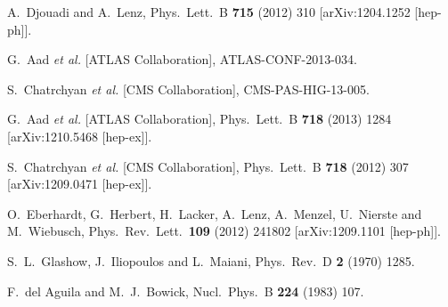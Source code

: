 \documentclass[12pt,a4paper]{article}
\begin{document}
\begin{thebibliography}{99}

  A.~Djouadi and A.~Lenz,
  Phys.\ Lett.\ B {\bf 715} (2012) 310
  [arXiv:1204.1252 [hep-ph]].

 G.~Aad {\it et al.}  [ATLAS Collaboration],
  ATLAS-CONF-2013-034.

 S.~Chatrchyan {\it et al.}  [CMS Collaboration],
  CMS-PAS-HIG-13-005.

  G.~Aad {\it et al.}  [ATLAS Collaboration],
  Phys.\ Lett.\ B {\bf 718} (2013) 1284
  [arXiv:1210.5468 [hep-ex]].

  S.~Chatrchyan {\it et al.}  [CMS Collaboration],
  Phys.\ Lett.\ B {\bf 718} (2012) 307
  [arXiv:1209.0471 [hep-ex]].

  O.~Eberhardt, G.~Herbert, H.~Lacker, A.~Lenz, A.~Menzel, U.~Nierste and M.~Wiebusch,
  Phys.\ Rev.\ Lett.\  {\bf 109} (2012) 241802
  [arXiv:1209.1101 [hep-ph]].

  S.~L.~Glashow, J.~Iliopoulos and L.~Maiani,
  Phys.\ Rev.\ D {\bf 2} (1970) 1285.

  F.~del Aguila and M.~J.~Bowick,
  Nucl.\ Phys.\ B {\bf 224} (1983) 107.


\end{thebibliography}
\end{document}

